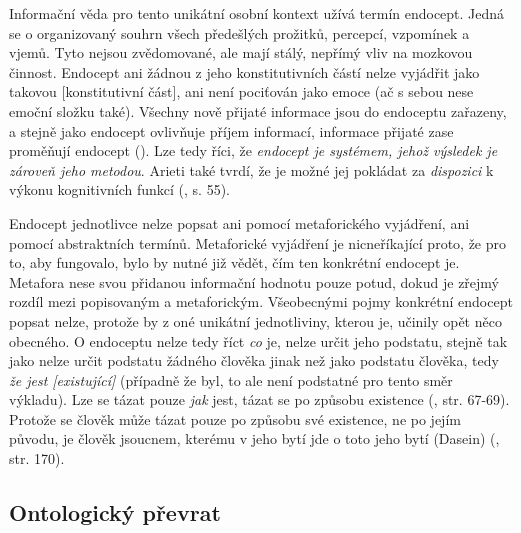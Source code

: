 \documentclass[11pt,a4paper]{article}
\begin{document}
Informační věda pro tento unikátní osobní kontext užívá termín endocept. Jedná se o organizovaný souhrn všech předešlých prožitků, percepcí, vzpomínek a vjemů. Tyto nejsou zvědomované, ale mají stálý, nepřímý vliv na mozkovou činnost. Endocept ani žádnou z jeho konstitutivních částí nelze vyjádřit jako takovou [konstitutivní část], ani není pociťován jako emoce (ač s sebou nese emoční složku také). Všechny nově přijaté informace jsou do endoceptu zařazeny, a stejně jako endocept ovlivňuje příjem informací, informace přijaté zase proměňují endocept (\cite{cejpek_informace_2006, arieti_creativity_1976}). Lze tedy říci, že \textit{endocept je systémem, jehož výsledek je zároveň jeho metodou}. Arieti také tvrdí, že je možné jej pokládat za \textit{dispozici} k výkonu kognitivních funkcí (\cite{arieti_creativity_1976}, s. 55).

Endocept jednotlivce nelze popsat ani pomocí metaforického vyjádření, ani pomocí abstraktních termínů. Metaforické vyjádření je nicneříkající proto, že pro to, aby fungovalo, bylo by nutné již vědět, čím ten konkrétní endocept je. Metafora nese svou přidanou informační hodnotu pouze potud, dokud je zřejmý rozdíl mezi popisovaným a metaforickým. Všeobecnými pojmy konkrétní endocept popsat nelze, protože by z oné unikátní jednotliviny, kterou je, učinily opět něco obecného. O endoceptu nelze tedy říct \textit{co} je, nelze určit jeho podstatu, stejně tak jako nelze určit podstatu žádného člověka jinak než jako podstatu člověka, tedy \textit{že jest [existující]} (případně že byl, to ale není podstatné pro tento směr výkladu). Lze se tázat pouze \textit{jak} jest, tázat se po způsobu existence (\cite{petricek_uvod_1992}, str. 67-69). Protože se člověk může tázat pouze po způsobu své existence, ne po jejím původu, je člověk jsoucnem, kterému v jeho bytí jde o toto jeho bytí (Dasein) (\cite{heidegger_byti_2002}, str. 170).




\subsection{Ontologický převrat}
\end{document}
